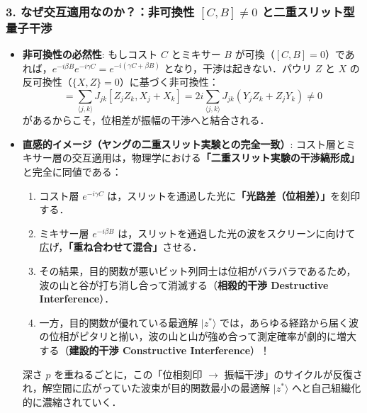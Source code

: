\documentclass[11pt,a4paper,oneside,openany]{ltjsbook}
\theoremstyle{definition}
\theoremstyle{plain}
\theoremstyle{remark}
\newcommand{\ket}[1]{|#1\rangle}
\begin{document}
\subsubsection*{3. なぜ交互適用なのか？：非可換性 $[C, B] \neq 0$ と二重スリット型量子干渉}
\begin{itemize}
    \item \textbf{非可換性の必然性}: もしコスト $C$ とミキサー $B$ が可換（$[C, B]=0$）であれば，$e^{-i\beta B} e^{-i\gamma C} = e^{-i(\gamma C + \beta B)}$ となり，干渉は起きない．パウリ $Z$ と $X$ の反可換性（$\{X, Z\}=0$）に基づく非可換性：
    \begin{equation}
        [C, B] = \sum_{\langle j, k \rangle} J_{jk} [Z_j Z_k, X_j + X_k] = 2i \sum_{\langle j, k \rangle} J_{jk} (Y_j Z_k + Z_j Y_k) \neq 0
    \end{equation}
    があるからこそ，位相差が振幅の干渉へと結合される．
    \item \textbf{直感的イメージ（ヤングの二重スリット実験との完全一致）}:
    コスト層とミキサー層の交互適用は，物理学における\textbf{「二重スリット実験の干渉縞形成」}と完全に同値である：
    \begin{enumerate}
        \item コスト層 $e^{-i\gamma C}$ は，スリットを通過した光に\textbf{「光路差（位相差）」}を刻印する．
        \item ミキサー層 $e^{-i\beta B}$ は，スリットを通過した光の波をスクリーンに向けて広げ，\textbf{「重ね合わせて混合」}させる．
        \item その結果，目的関数が悪いビット列同士は位相がバラバラであるため，波の山と谷が打ち消し合って消滅する（\textbf{相殺的干渉 Destructive Interference}）．
        \item 一方，目的関数が優れている最適解 $\ket{z^*}$ では，あらゆる経路から届く波の位相がピタリと揃い，波の山と山が強め合って測定確率が劇的に増大する（\textbf{建設的干渉 Constructive Interference}）！
    \end{enumerate}
    深さ $p$ を重ねるごとに，この「位相刻印 $\to$ 振幅干渉」のサイクルが反復され，解空間に広がっていた波束が目的関数最小の最適解 $\ket{z^*}$ へと自己組織化的に濃縮されていく．
\end{itemize}
\end{document}
